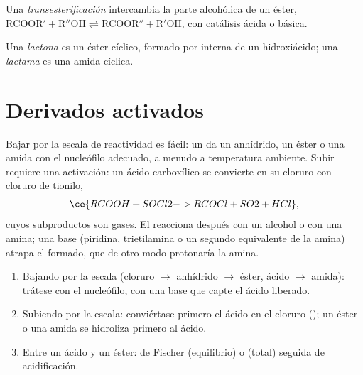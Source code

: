 \begin{definition}[Transesterificación]\label{def:b2:acyl-substitution:transesterification}
Una \emph{transesterificación} intercambia la parte alcohólica de un éster,
$\mathrm{RCOOR' + R''OH \rightleftharpoons RCOOR'' + R'OH}$, con catálisis ácida o básica.
\end{definition}

\begin{definition}\label{def:b2:acyl-substitution:lactone}
Una \emph{lactona} es un éster cíclico, formado por  interna de un
hidroxiácido; una \emph{lactama} es una amida cíclica.
\end{definition}

\section{Derivados activados}

Bajar por la escala de reactividad es fácil: un  da un anhídrido, un éster o una
amida con el nucleófilo adecuado, a menudo a temperatura ambiente. Subir requiere una activación: un
ácido carboxílico se convierte en su cloruro con cloruro de tionilo,
\[
  \ce{RCOOH + SOCl2 -> RCOCl + SO2 + HCl} ,
\]
cuyos subproductos son gases. El  reacciona después con un alcohol o con una amina; una base
(piridina, trietilamina o un segundo equivalente de la amina) atrapa el  formado, que
de otro modo protonaría la amina.

\begin{method}\label{met:b2:acyl-substitution:ladder}
\begin{enumerate}
  \item Bajando por la escala (cloruro $\to$ anhídrido $\to$ éster, ácido $\to$ amida): trátese con el
        nucleófilo, con una base que capte el ácido liberado.
  \item Subiendo por la escala: conviértase primero el ácido en el cloruro (); un éster o una amida
        se hidroliza primero al ácido.
  \item Entre un ácido y un éster:  de Fischer (equilibrio) o 
        (total) seguida de acidificación.
\end{enumerate}
\end{method}

